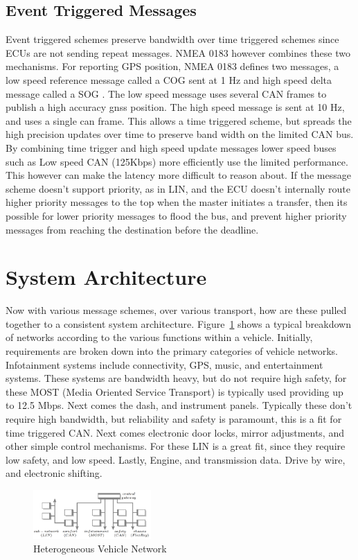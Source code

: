 \documentclass[conference,12pt]{IEEEtran}
\begin{document}
\subsection{Event Triggered Messages}
Event triggered schemes preserve bandwidth over time triggered schemes since
ECUs are not sending repeat messages. NMEA 0183 however combines these two
mechanisms. For reporting GPS position, NMEA 0183 defines two messages, a low speed
reference message called a COG sent at 1 Hz and high speed delta message called a SOG
\autocite{_nmea}. The
low speed message uses several CAN frames to publish a high accuracy gnss
position. The high speed message is sent at 10 Hz, and uses a single can frame.
This allows a time triggered scheme, but spreads the high precision updates over
time to preserve band width on the limited CAN bus.  By combining time trigger
and high speed update messages lower speed
buses such as Low speed CAN (125Kbps) more efficiently use the
limited performance. This however can make the latency more difficult to reason
about. If the message scheme doesn't support priority, as in LIN, and the ECU
doesn't internally route higher priority messages to the top when the master
initiates a transfer, then its possible for
lower priority messages to flood the bus, and prevent higher priority messages
from reaching the destination before the deadline. 

\section{System Architecture}
Now with various message schemes, over various transport, how are these pulled
together to a consistent system architecture.
Figure~\ref{fig:heterogenous_network} shows a typical breakdown of networks
according to the various functions within a vehicle. Initially, requirements are
broken down into the primary categories of vehicle networks.  Infotainment
systems include connectivity, GPS, music, and entertainment systems. These
systems are bandwidth heavy, but do not require high safety, for these MOST
(Media Oriented Service Transport) is typically used providing up to 12.5 Mbps.
Next comes the dash, and instrument panels. Typically these don't require high
bandwidth, but reliability and safety is paramount, this is a fit for time
triggered CAN.  Next comes electronic door locks, mirror adjustments, and other
simple control mechanisms. For these LIN is a great fit, since they require low
safety, and low speed.  Lastly, Engine, and transmission data. Drive by wire,
and electronic shifting. 
\begin{figure}
  \centering
  \includegraphics[width=0.4\textwidth]{network_topography.png}
  \caption{Heterogeneous Vehicle Network \autocite{lukasiewycz_system_2013}}
  \label{fig:heterogenous_network}
\end{figure}
\end{document}
